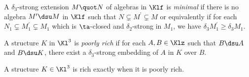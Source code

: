 A $\delta_{3}$-strong extension $M\quot N$ of algebras in $\Klf$ is \emph{minimal} if there is no algebra
$M^{\prime}\dsu M$ in $\Klf$ such that $N\subsetneq M^{\prime}\subsetneq M$ or equivalently if for
each $N_{1}\subsetneq M^{\prime}_{1}\subsetneq M_{1}$ which is $\ta$-closed and $\delta_{2}$-strong in $M_{1}$,
we have $\delta_{3}M_{1}^{\prime}\geq\delta_{3}M_{1}$.

\begin{dfn}
A structure $K$ in $\Kl^{3}$ is \emph{poorly rich} if for each $A,B\in\Klz$ such that $B\dsu A$ and $B\dsu K$,
there exist a $\delta_{3}$-strong embedding of $A$ in $K$ over $B$.
\end{dfn}
\begin{prop}\label{richnotrich}
A structure $K\in\Kl^{3}$ is rich exactly when it is poorly rich.
\end{prop}
